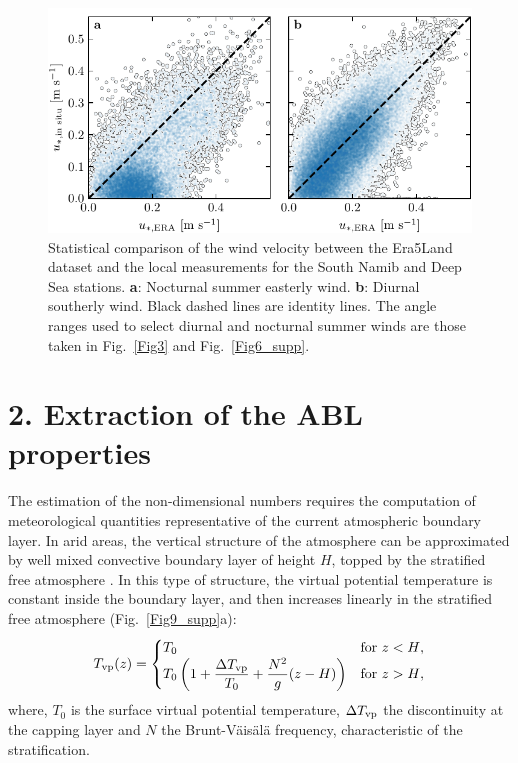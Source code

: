 \begin{figure}
  \centering
  \includegraphics[scale=1]{Figures/Figure8_supp.pdf}
  \caption{Statistical comparison of the wind velocity between the Era5Land dataset and the local measurements for the South Namib and Deep Sea stations. \textbf{a}: Nocturnal summer easterly wind. \textbf{b}: Diurnal southerly wind. Black dashed lines are identity lines. The angle ranges used to select diurnal and nocturnal summer winds are those taken in Fig.~\ref{Fig3} and Fig.~\ref{Fig6_supp}.}
  \label{Fig8_supp}
\end{figure}

\section*{2. Extraction of the ABL properties}

The estimation of the non-dimensional numbers requires the computation of meteorological quantities representative of the current atmospheric boundary layer. In arid areas, the vertical structure of the atmosphere can be approximated by well mixed convective boundary layer of height $H$, topped by the stratified free atmosphere \citep{Stull1988, Shao2008}.
%
In this type of structure, the virtual potential temperature is constant inside the boundary layer, and then increases linearly in the stratified free atmosphere (Fig.~\ref{Fig9_supp}a):
\begin{equation}
  T_{\textup{vp}}(z) = \begin{cases}
                          T_{0} &\text{for $z < H$},\\
                          T_{0}\left(1 + \displaystyle\frac{\Delta T_{\textup{vp}}}{T_{0}} + \frac{N^{2}}{g}(z - H)\right) &\text{for $ z > H$},
                        \end{cases}
\end{equation}
where, $T_{0}$ is the surface virtual potential temperature, $\Delta T_{\textup{vp}}$ the discontinuity at the capping layer and $N$ the Brunt-Väisälä frequency, characteristic of the stratification.

